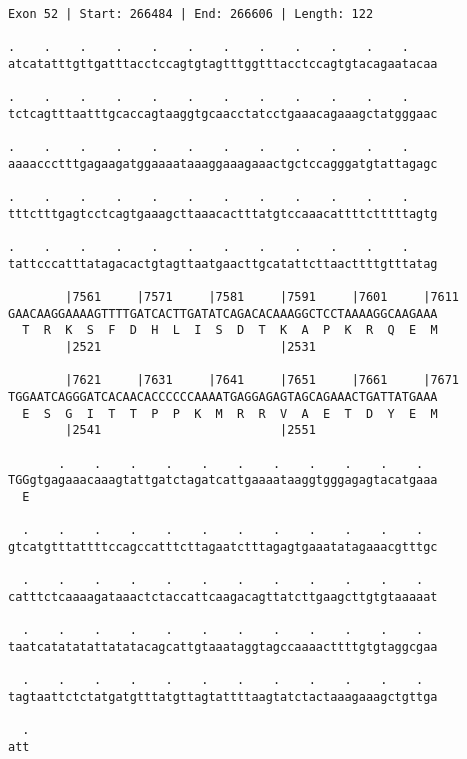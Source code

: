 \documentclass{article}
\begin{document}
\newpage
\begin{Verbatim}[fontfamily=courier]
Exon 52 | Start: 266484 | End: 266606 | Length: 122

.    .    .    .    .    .    .    .    .    .    .    .    
atcatatttgttgatttacctccagtgtagtttggtttacctccagtgtacagaatacaa

.    .    .    .    .    .    .    .    .    .    .    .    
tctcagtttaatttgcaccagtaaggtgcaacctatcctgaaacagaaagctatgggaac

.    .    .    .    .    .    .    .    .    .    .    .    
aaaaccctttgagaagatggaaaataaaggaaagaaactgctccagggatgtattagagc

.    .    .    .    .    .    .    .    .    .    .    .    
tttctttgagtcctcagtgaaagcttaaacactttatgtccaaacattttctttttagtg

.    .    .    .    .    .    .    .    .    .    .    .    
tattcccatttatagacactgtagttaatgaacttgcatattcttaacttttgtttatag

        |7561     |7571     |7581     |7591     |7601     |7611
GAACAAGGAAAAGTTTTGATCACTTGATATCAGACACAAAGGCTCCTAAAAGGCAAGAAA
  T  R  K  S  F  D  H  L  I  S  D  T  K  A  P  K  R  Q  E  M
        |2521                         |2531                 

        |7621     |7631     |7641     |7651     |7661     |7671
TGGAATCAGGGATCACAACACCCCCCAAAATGAGGAGAGTAGCAGAAACTGATTATGAAA
  E  S  G  I  T  T  P  P  K  M  R  R  V  A  E  T  D  Y  E  M
        |2541                         |2551                 

       .    .    .    .    .    .    .    .    .    .    .  
TGGgtgagaaacaaagtattgatctagatcattgaaaataaggtgggagagtacatgaaa
  E                                                         

  .    .    .    .    .    .    .    .    .    .    .    .  
gtcatgtttattttccagccatttcttagaatctttagagtgaaatatagaaacgtttgc

  .    .    .    .    .    .    .    .    .    .    .    .  
catttctcaaaagataaactctaccattcaagacagttatcttgaagcttgtgtaaaaat

  .    .    .    .    .    .    .    .    .    .    .    .  
taatcatatatattatatacagcattgtaaataggtagccaaaacttttgtgtaggcgaa

  .    .    .    .    .    .    .    .    .    .    .    .  
tagtaattctctatgatgtttatgttagtattttaagtatctactaaagaaagctgttga

  .
att
\end{Verbatim}
\newpage
\end{document}
